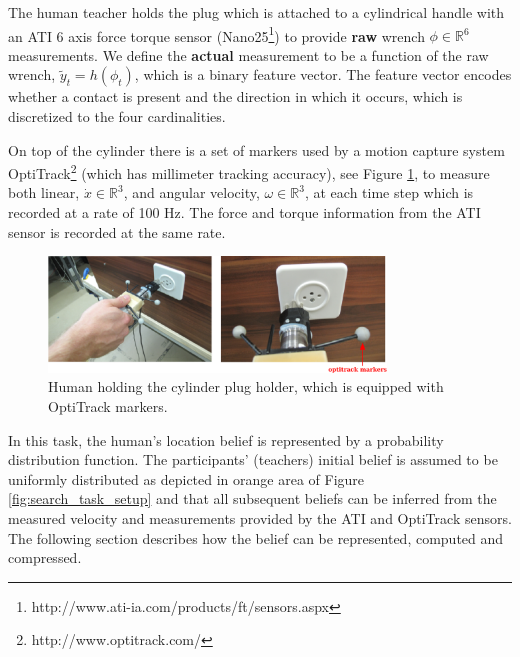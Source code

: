 The human teacher holds the plug which is attached to a cylindrical handle with 
an ATI 6 axis force torque sensor (Nano25\footnote{http://www.ati-ia.com/products/ft/sensors.aspx}) 
to provide \textbf{raw} wrench $\phi \in \mathbb{R}^6$ measurements. We define the \textbf{actual} measurement 
to be a function of the raw wrench, $\tilde{y}_t = h(\phi_t)$, which is a binary feature vector. The feature vector encodes whether a contact is present 
and the direction in which it occurs, which is discretized to the four cardinalities.

On top of the cylinder there is a set of markers used by a motion capture system OptiTrack\footnote{http://www.optitrack.com/}
(which has millimeter tracking accuracy), 
see Figure \ref{fig:plug_cylinder}, to measure both linear, $\dot{x} \in \mathbb{R}^3$, and angular 
velocity, $\omega \in \mathbb{R}^3$, at each time step which is recorded at a rate of 100 Hz. The force and torque information 
from the ATI sensor is recorded at the same rate. 

\begin{figure}
 \centering
 \includegraphics[width=0.8\textwidth]{./ch4-PiH/Figures/Fig/plug_socket_closeup.pdf}
 \caption{Human holding the cylinder plug holder, which is equipped with OptiTrack markers.}
 \label{fig:plug_cylinder}
\end{figure}

In this task, the human's location belief is represented by a probability distribution function. 
The participants' (teachers) initial belief is assumed to be uniformly distributed as depicted 
in orange area of Figure \ref{fig:search_task_setup} and that all subsequent beliefs can be inferred from the measured velocity 
and measurements provided by the ATI and OptiTrack sensors. The following section describes how the belief can be represented, 
computed and compressed.

